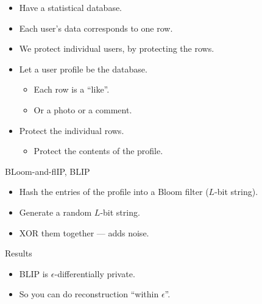 \begin{frame}
  \begin{example}
    \begin{itemize}
      \item Have a statistical database.
      \item Each user's data corresponds to one row.

        \pause{}

      \item We protect individual users, by protecting the rows.
    \end{itemize}
  \end{example}

  \pause

  \begin{example}
    \begin{itemize}
      \item Let a user profile be the database.
        \begin{itemize}
          \item Each row is a \enquote{like}.
          \item Or a photo or a comment.
        \end{itemize}

        \pause{}

      \item Protect the individual rows.
        \begin{itemize}
          \item Protect the contents of the profile.
        \end{itemize}
    \end{itemize}
  \end{example}
\end{frame}

\begin{frame}
  \begin{block}{BLoom-and-flIP, BLIP}
    \begin{itemize}
      \item Hash the entries of the profile into a Bloom filter (\(L\)-bit 
        string).

        \pause

      \item Generate a random \(L\)-bit string.
      \item XOR them together --- adds noise.
    \end{itemize}
  \end{block}

  \pause

  \begin{block}{Results}
    \begin{itemize}
      \item BLIP is \(\epsilon\)-differentially private.
      \item So you can do reconstruction \enquote{within \(\epsilon\)}.
    \end{itemize}
  \end{block}
\end{frame}


